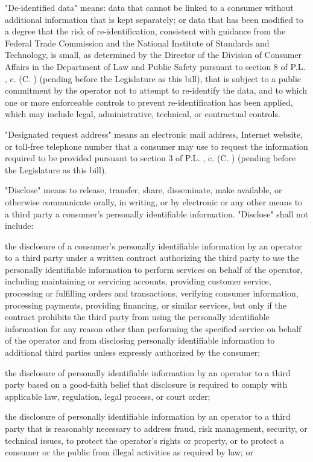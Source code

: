      "De-identified data" means: data that cannot be linked to a consumer without additional information that is kept separately; or data that has been modified to a degree that the risk of re-identification, consistent with guidance from the Federal Trade Commission and the National Institute of Standards and Technology, is small, as determined by the Director of the Division of Consumer Affairs in the Department of Law and Public Safety pursuant to section 8 of P.L.    , c.    (C.      ) (pending before the Legislature as this bill), that is subject to a public commitment by the operator not to attempt to re-identify the data, and to which one or more enforceable controls to prevent re-identification has been applied, which may include legal, administrative, technical, or contractual controls.

     "Designated request address" means an electronic mail address, Internet website, or toll-free telephone number that a consumer may use to request the information required to be provided pursuant to section 3 of P.L.    , c.    (C.      ) (pending before the Legislature as this bill).

     "Disclose" means to release, transfer, share, disseminate, make available, or otherwise communicate orally, in writing, or by electronic or any other means to a third party a consumer's personally identifiable information. "Disclose" shall not include:

     the disclosure of a consumer's personally identifiable information by an operator to a third party under a written contract authorizing the third party to use the personally identifiable information to perform services on behalf of the operator, including maintaining or servicing accounts, providing customer service, processing or fulfilling orders and transactions, verifying consumer information, processing payments, providing financing, or similar services, but only if the contract prohibits the third party from using the personally identifiable information for any reason other than performing the specified service on behalf of the operator and from disclosing personally identifiable information to additional third parties unless expressly authorized by the consumer;

     the disclosure of personally identifiable information by an operator to a third party based on a good-faith belief that disclosure is required to comply with applicable law, regulation, legal process, or court order;

     the disclosure of personally identifiable information by an operator to a third party that is reasonably necessary to address fraud, risk management, security, or technical issues, to protect the operator's rights or property, or to protect a consumer or the public from illegal activities as required by law; or

